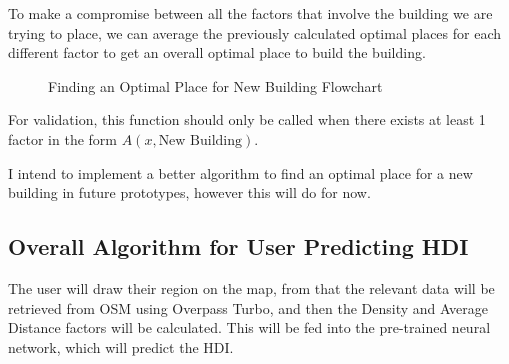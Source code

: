 \documentclass[12pt]{report}
\begin{document}
To make a compromise between all the factors that involve the building we are trying to place, we can average the previously calculated optimal places for each different factor to get an overall optimal place to build the building.
\begin{figure}[H]
\centering
{}
\caption{Finding an Optimal Place for New Building Flowchart}\label{fig:newBuilding}
\end{figure}
For validation, this function should only be called when there exists at least 1 factor in the form $A\left(x,\text{New Building}\right)$.

I intend to implement a better algorithm to find an optimal place for a new building in future prototypes, however this will do for now.

\subsection{Overall Algorithm for User Predicting HDI}\label{sec:predictHDIFullAlgo}
The user will draw their region on the map, from that the relevant data will be retrieved from OSM using Overpass Turbo, and then the Density and Average Distance factors will be calculated. This will be fed into the pre-trained neural network, which will predict the HDI.
\end{document}
